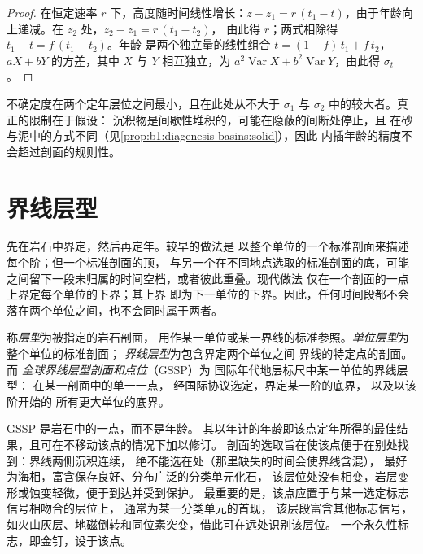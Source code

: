 \begin{proof}
在恒定速率 $r$ 下，高度随时间线性增长：$z - z_1 = r\,(t_1
- t)$，由于年龄向上递减。在 $z_2$ 处，$z_2 - z_1 = r\,(t_1 - t_2)$，
由此得 $r$；两式相除得 $t_1 - t = f\,(t_1 - t_2)$。年龄
是两个独立量的线性组合 $t = (1 - f)\,t_1 + f\,t_2$，
$a X + b Y$ 的方差，其中 $X$ 与 $Y$ 相互独立，为 $a^2
\operatorname{Var} X + b^2 \operatorname{Var} Y$，由此得 $\sigma_t$。
\end{proof}

不确定度在两个定年层位之间最小，且在此处从不大于
$\sigma_1$ 与 $\sigma_2$ 中的较大者。真正的限制在于假设：
沉积物是间歇性堆积的，可能在隐蔽的间断处停止，且
在砂与泥中的方式不同（见\cref{prop:b1:diagenesis-basins:solid}），因此
内插年龄的精度不会超过剖面的规则性。

\section{界线层型}\label{sec:b1:stratigraphic-scale:gssp}

先在岩石中界定，然后再定年。较早的做法是
以整个单位的一个标准剖面来描述每个阶；但一个标准剖面的顶，
与另一个在不同地点选取的标准剖面的底，可能
之间留下一段未归属的时间空档，或者彼此重叠。现代做法
仅在一个剖面的一点上界定每个单位的下界；其上界
即为下一单位的下界。因此，任何时间段都不会
落在两个单位之间，也不会同时属于两者。

\begin{definition}\label{def:b1:stratigraphic-scale:gssp}
称\emph{层型}为被指定的岩石剖面，
用作某一单位或某一界线的标准参照。\emph{单位层型}为整个单位的标准剖面；
\emph{界线层型}为包含界定两个单位之间
界线的特定点的剖面。而
\emph{全球界线层型剖面和点位}（GSSP）为
国际年代地层标尺中某一单位的界线层型：
在某一剖面中的单一一点，
经国际协议选定，界定某一阶的底界，
以及以该阶开始的
所有更大单位的底界。
\end{definition}

GSSP 是岩石中的一点，而不是年龄。
其以年计的年龄即该点定年所得的最佳结果，且可在不移动该点的情况下加以修订。
剖面的选取旨在使该点便于在别处找到：界线两侧沉积连续，
绝不能选在处（那里缺失的时间会使界线含混），
最好为海相，富含保存良好、分布广泛的分类单元化石，
该层位处没有相变，岩层变形或蚀变轻微，便于到达并受到保护。
最重要的是，该点应置于与某一选定标志信号相吻合的层位上，
通常为某一分类单元的首现，
该层段富含其他标志信号，
如火山灰层、地磁倒转和同位素突变，借此可在远处识别该层位。
一个永久性标志，即金钉，设于该点。

